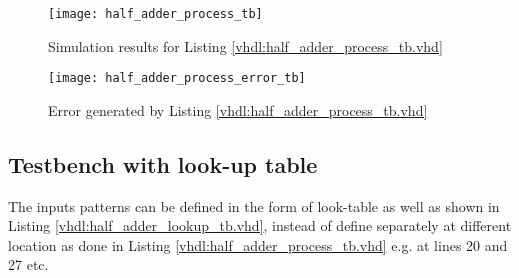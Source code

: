 

\begin{figure}[!h]
	\centering
	\texttt{[image: half\_adder\_process\_tb]}
	\caption{Simulation results for Listing \ref{vhdl:half_adder_process_tb.vhd}}
	\label{fig:half_adder_process_tb}
\end{figure}

\begin{figure}[!h]
	\centering
	\texttt{[image: half\_adder\_process\_error\_tb]}
	\caption{Error generated by Listing \ref{vhdl:half_adder_process_tb.vhd}}
	\label{fig:half_adder_process_error_tb}
\end{figure}

\subsection{Testbench with look-up table}

The inputs patterns can be defined in the form of look-table as well as shown in Listing \ref{vhdl:half_adder_lookup_tb.vhd}, instead of define separately at different location as done in Listing \ref {vhdl:half_adder_process_tb.vhd} e.g. at lines 20 and 27 etc. 

